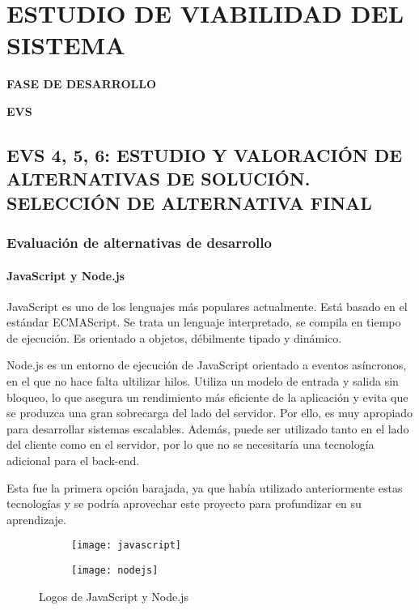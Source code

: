 \newpage
\chapter{ESTUDIO DE VIABILIDAD DEL SISTEMA}
	\vspace{2cm}	
	\begin{center}
	{\Large \textbf{FASE DE DESARROLLO} \par}
	\end{center}
	\vspace{5cm}
	
	\begin{center}
	\Huge \textbf{EVS}\par
	\end{center}\newpage
\section[EVS 4, 5, 6: ESTUDIO Y VALORACIÓN DE ALTERNATIVAS DE \\ SOLUCIÓN. SELECCIÓN DE ALTERNATIVA FINAL]{EVS 4, 5, 6: ESTUDIO Y VALORACIÓN DE ALTERNATIVAS DE SOLUCIÓN. SELECCIÓN DE ALTERNATIVA FINAL}

\subsection{Evaluación de alternativas de desarrollo} 
\subsubsection{JavaScript y Node.js}
JavaScript es uno de los lenguajes más populares actualmente. Está basado en el estándar ECMAScript. Se trata un lenguaje interpretado, se compila en tiempo de ejecución. Es orientado a objetos, débilmente tipado y dinámico\cite{JavaScript}. 
\par Node.js es un entorno de ejecución de JavaScript orientado a eventos asíncronos, en el que no hace falta ultilizar hilos. Utiliza un modelo de entrada y salida sin bloqueo, lo que asegura un rendimiento más eficiente de la aplicación y evita que se produzca una gran sobrecarga del lado del servidor. Por ello, es muy apropiado para desarrollar sistemas escalables\cite{NodeJS}. Además, puede ser utilizado tanto en el lado del cliente como en el servidor, por lo que no se necesitaría una tecnología adicional para el back-end.
\par Esta fue la primera opción barajada, ya que había utilizado anteriormente estas tecnologías y se podría aprovechar este proyecto para profundizar en su aprendizaje.
\begin{figure}[H]
	\centering
	\begin{subfigure}{0.3\textwidth}
	\centering
	\texttt{[image: javascript]}
	\end{subfigure}
	\begin{subfigure}{0.3\textwidth}
	\centering
	\texttt{[image: nodejs]}
	\end{subfigure}
	\caption{Logos de JavaScript y Node.js}
\end{figure}

